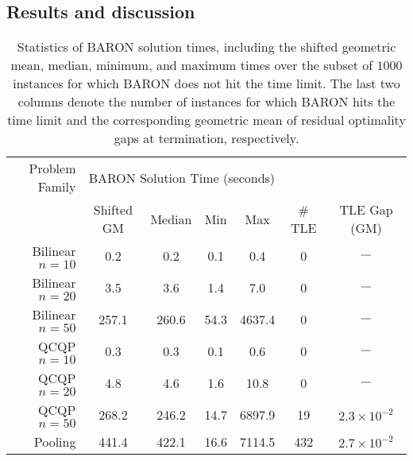 \documentclass{article}
\begin{document}
\subsection{Results and discussion}
\label{subsec:results}




\begin{table}
\centering
\begin{tabular}{ r | c c c c | c c }
\hline
Problem Family & \multicolumn{4}{c|}{BARON Solution Time (seconds)} \\
 & Shifted GM & Median & Min & Max & \# TLE & TLE Gap (GM) \\ \hline
Bilinear $n = 10$  &  0.2  &  0.2  &  0.1  &  0.4  &  0  & $\underline{\hspace{0.3cm}}$  \\
Bilinear $n = 20$  &  3.5  &  3.6  &  1.4  &  7.0  &  0  & $\underline{\hspace{0.3cm}}$ \\
Bilinear $n = 50$  &  257.1  &  260.6  &  54.3  &  4637.4  &  0  & $\underline{\hspace{0.3cm}}$ \\[0.1in]
QCQP $n = 10$  &  0.3  &  0.3  &  0.1  &  0.6  &  0  & $\underline{\hspace{0.3cm}}$  \\
QCQP $n = 20$  &  4.8  &  4.6  &  1.6  &  10.8  &  0  & $\underline{\hspace{0.3cm}}$ \\
QCQP $n = 50$  &  268.2  &  246.2  &  14.7  &  6897.9  &  19  & $2.3 \times 10^{-2}$ \\[0.1in]
Pooling  &  441.4  &  422.1  &  16.6  &  7114.5  &  432  &  $2.7 \times 10^{-2}$ \\  \hline
\end{tabular}
\caption{Statistics of BARON solution times,
including the shifted geometric mean, median, minimum, and maximum times over the subset of $1000$ instances for which BARON does not hit the time limit. 
The last two columns denote the number of instances for which BARON hits the time limit and the corresponding geometric mean of residual optimality gaps at termination, respectively.
}
\label{tab:baron_times}
\end{table}
\end{document}
